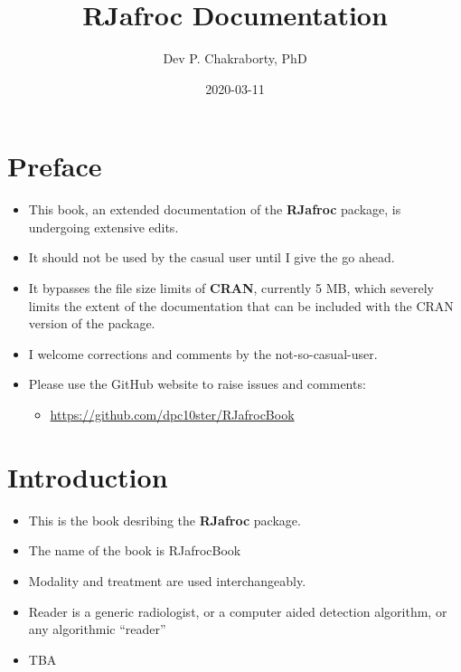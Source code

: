 \documentclass[]{book}
\title{RJafroc Documentation}
\author{Dev P. Chakraborty, PhD}
\date{2020-03-11}
\providecommand{\tightlist}{%
  \setlength{\itemsep}{0pt}\setlength{\parskip}{0pt}}
\begin{document}
\maketitle

{
\setcounter{tocdepth}{1}
\tableofcontents
}
\hypertarget{preface}{%
\chapter*{Preface}\label{preface}}

\begin{itemize}
\tightlist
\item
  This book, an extended documentation of the \textbf{RJafroc} package, is undergoing extensive edits.
\item
  It should not be used by the casual user until I give the go ahead.
\item
  It bypasses the file size limits of \textbf{CRAN}, currently 5 MB, which severely limits the extent of the documentation that can be included with the CRAN version of the package.
\item
  I welcome corrections and comments by the not-so-casual-user.
\item
  Please use the GitHub website to raise issues and comments:

  \begin{itemize}
  \tightlist
  \item
    \url{https://github.com/dpc10ster/RJafrocBook}
  \end{itemize}
\end{itemize}

\hypertarget{intro}{%
\chapter{Introduction}\label{intro}}

\begin{itemize}
\tightlist
\item
  This is the book desribing the \textbf{RJafroc} package.
\item
  The name of the book is RJafrocBook
\item
  Modality and treatment are used interchangeably.
\item
  Reader is a generic radiologist, or a computer aided detection algorithm, or any algorithmic ``reader''
\item
  TBA
\end{itemize}
\end{document}
